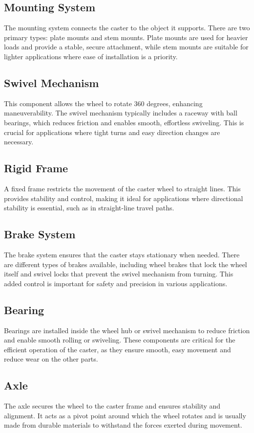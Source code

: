 \documentclass[../../main]{subfiles}
\begin{document}
\subsection{Mounting System}
The mounting system connects the caster to the object it supports. There are two primary types: plate mounts and stem mounts. Plate mounts are used for heavier loads and provide a stable, secure attachment, while stem mounts are suitable for lighter applications where ease of installation is a priority.

\subsection{Swivel Mechanism}
This component allows the wheel to rotate 360 degrees, enhancing maneuverability. The swivel mechanism typically includes a raceway with ball bearings, which reduces friction and enables smooth, effortless swiveling. This is crucial for applications where tight turns and easy direction changes are necessary.

\subsection{Rigid Frame}
A fixed frame restricts the movement of the caster wheel to straight lines. This provides stability and control, making it ideal for applications where directional stability is essential, such as in straight-line travel paths.

\subsection{Brake System}
The brake system ensures that the caster stays stationary when needed. There are different types of brakes available, including wheel brakes that lock the wheel itself and swivel locks that prevent the swivel mechanism from turning. This added control is important for safety and precision in various applications.

\subsection{Bearing}
Bearings are installed inside the wheel hub or swivel mechanism to reduce friction and enable smooth rolling or swiveling. These components are critical for the efficient operation of the caster, as they ensure smooth, easy movement and reduce wear on the other parts.

\subsection{Axle}
The axle secures the wheel to the caster frame and ensures stability and alignment. It acts as a pivot point around which the wheel rotates and is usually made from durable materials to withstand the forces exerted during movement.
\end{document}
